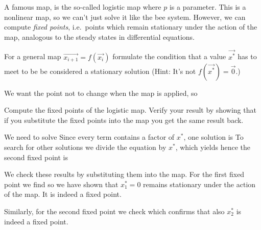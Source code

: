A famous map, is the so-called logistic map 
where $p$ is a parameter. This is a nonlinear map, so we can't just solve it like the bee system. However, we can compute \emph{fixed points}, i.e.~points which remain stationary under the action of the map, analogous to the steady states in differential equations. 

\subquestion 
For a general map $\vec{x_{i+1}}=f(\vec{x_i})$ formulate the condition 
that a value $\vec{x^*}$ has to meet to be be considered a stationary solution (Hint: It's not $f(\vec{x^*}) = \vec{0}$.)

\solution
We want the point not to change when the map is applied, so 

\subquestion
Compute the fixed points of the logistic map. Verify your result by showing that if you substitute the fixed points into the map you get the same result back. 

\solution
We need to solve 
Since every term contains a factor of $x^*$, one solution is 
To search for other solutions we divide the equation by $x^*$, which yields
hence the second fixed point is 

We check these results by substituting them into the map. For the first fixed point we find 
so we have shown that $x_1^*=0$ remains stationary under the action of the map. It is indeed a fixed point. 

Similarly, for the second fixed point we check
which confirms that also $x_2^*$ is indeed a fixed point.

